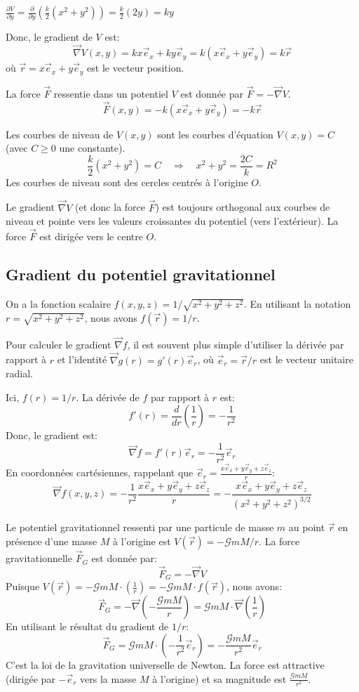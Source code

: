 \documentclass[french]{yLectureNote}
\renewcommand{\vec}{\overrightarrow}
\begin{document}
$\frac{\partial V}{\partial y} = \frac{\partial}{\partial y} \left( \frac{k}{2}(x^{2}+y^{2}) \right) = \frac{k}{2}(2y) = ky$

Donc, le gradient de $V$ est:
$$
\vec{\nabla}V(x,y) = kx\vec{e}_{x} + ky\vec{e}_{y} = k(x\vec{e}_{x} + y\vec{e}_{y}) = k\vec{r}
$$
où $\vec{r} = x\vec{e}_{x} + y\vec{e}_{y}$ est le vecteur position.


La force $\vec{F}$ ressentie dans un potentiel $V$ est donnée par $\vec{F} = -\vec{\nabla}V$.
$$
\vec{F}(x,y) = -k(x\vec{e}_{x} + y\vec{e}_{y}) = -k\vec{r}
$$

Les courbes de niveau de $V(x,y)$ sont les courbes d'équation $V(x,y) = C$ (avec $C \ge 0$ une constante).
$$
\frac{k}{2}(x^{2}+y^{2}) = C \quad \Rightarrow \quad x^{2}+y^{2} = \frac{2C}{k} = R^2
$$
Les courbes de niveau sont des cercles centrés à l'origine $O$.

Le gradient $\vec{\nabla}V$ (et donc la force $\vec{F}$) est toujours orthogonal aux courbes de niveau et pointe vers les valeurs croissantes du potentiel (vers l'extérieur). La force $\vec{F}$ est dirigée vers le centre $O$.
\subsection{Gradient du potentiel gravitationnel}

On a la fonction scalaire $f(x,y,z)=1/\sqrt{x^{2}+y^{2}+z^{2}}$. En utilisant la notation $r = \sqrt{x^{2}+y^{2}+z^{2}}$, nous avons $f(\vec{r}) = 1/r$.


Pour calculer le gradient $\vec{\nabla}f$, il est souvent plus simple d'utiliser la dérivée par rapport à $r$ et l'identité $\vec{\nabla}g(r) = g'(r)\vec{e}_{r}$, où $\vec{e}_{r} = \vec{r}/r$ est le vecteur unitaire radial.

Ici, $f(r) = 1/r$.
La dérivée de $f$ par rapport à $r$ est:
$$
f'(r) = \frac{d}{dr} \left(\frac{1}{r}\right) = -\frac{1}{r^{2}}
$$
Donc, le gradient est:
$$
\vec{\nabla}f = f'(r)\vec{e}_{r} = -\frac{1}{r^{2}}\vec{e}_{r}
$$
En coordonnées cartésiennes, rappelant que $\vec{e}_{r} = \frac{x\vec{e}_{x} + y\vec{e}_{y} + z\vec{e}_{z}}{r}$:
$$
\vec{\nabla}f(x,y,z) = -\frac{1}{r^{2}}\frac{x\vec{e}_{x} + y\vec{e}_{y} + z\vec{e}_{z}}{r} = -\frac{x\vec{e}_{x} + y\vec{e}_{y} + z\vec{e}_{z}}{(x^{2}+y^{2}+z^{2})^{3/2}}
$$

Le potentiel gravitationnel ressenti par une particule de masse $m$ au point $\vec{r}$ en présence d'une masse $M$ à l'origine est $V(\vec{r})=-\mathcal{G}mM/r$.
La force gravitationnelle $\vec{F}_{G}$ est donnée par:
$$
\vec{F}_{G} = -\vec{\nabla}V
$$
Puisque $V(\vec{r}) = -\mathcal{G}mM \cdot \left(\frac{1}{r}\right) = -\mathcal{G}mM \cdot f(\vec{r})$, nous avons:
$$
\vec{F}_{G} = -\vec{\nabla}\left(-\frac{\mathcal{G}mM}{r}\right) = \mathcal{G}mM \cdot \vec{\nabla}\left(\frac{1}{r}\right)
$$
En utilisant le résultat du gradient de $1/r$:
$$
\vec{F}_{G} = \mathcal{G}mM \cdot \left(-\frac{1}{r^{2}}\vec{e}_{r}\right) = -\frac{\mathcal{G}mM}{r^{2}}\vec{e}_{r}
$$
C'est la loi de la gravitation universelle de Newton. La force est attractive (dirigée par $-\vec{e}_{r}$ vers la masse $M$ à l'origine) et sa magnitude est $\frac{\mathcal{G}mM}{r^{2}}$.
\end{document}
